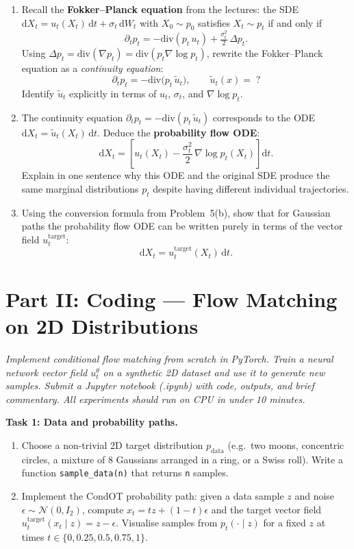 \documentclass[11pt]{article}
\theoremstyle{definition}
\theoremstyle{remark}
\newcommand{\N}{\mathcal{N}}
\newcommand{\dd}{\mathrm{d}}
\begin{document}
\begin{enumerate}\renewcommand{\labelenumi}{(\alph{enumi})}
\item Recall the \textbf{Fokker--Planck equation} from the lectures: the SDE $\dd X_t = u_t(X_t)\,\dd t + \sigma_t\,\dd W_t$ with $X_0 \sim p_0$ satisfies $X_t \sim p_t$ if and only if
\[
\partial_t p_t = -\mathrm{div}(p_t\, u_t) + \tfrac{\sigma_t^2}{2}\,\Delta p_t.
\]
Using $\Delta p_t = \mathrm{div}(\nabla p_t) = \mathrm{div}(p_t \nabla \log p_t)$, rewrite the Fokker--Planck equation as a \emph{continuity equation}:
\[
\partial_t p_t = -\mathrm{div}\!\bigl(p_t\,\tilde{u}_t\bigr), \qquad \tilde{u}_t(x) = \; ?
\]
Identify $\tilde{u}_t$ explicitly in terms of $u_t$, $\sigma_t$, and $\nabla \log p_t$.

\item The continuity equation $\partial_t p_t = -\mathrm{div}(p_t\,\tilde{u}_t)$ corresponds to the ODE $\dd X_t = \tilde{u}_t(X_t)\,\dd t$. Deduce the \textbf{probability flow ODE}:
\[
\boxed{\dd X_t = \left[u_t(X_t) - \frac{\sigma_t^2}{2}\,\nabla \log p_t(X_t)\right]\dd t.}
\]
Explain in one sentence why this ODE and the original SDE produce the same marginal distributions $p_t$ despite having different individual trajectories.

\item Using the conversion formula from Problem~5(b), show that for Gaussian paths the probability flow ODE can be written purely in terms of the vector field $u_t^{\mathrm{target}}$:
\[
\dd X_t = u_t^{\mathrm{target}}(X_t)\,\dd t.
\]

\end{enumerate}

\newpage

\section*{Part II: Coding --- Flow Matching on 2D Distributions}

\textit{Implement conditional flow matching from scratch in PyTorch. Train a neural network vector field $u_t^\theta$ on a synthetic 2D dataset and use it to generate new samples. Submit a Jupyter notebook (.ipynb) with code, outputs, and brief commentary. All experiments should run on CPU in under 10 minutes.}

\medskip

\textbf{Task 1: Data and probability paths.}
\begin{enumerate}\renewcommand{\labelenumi}{(\alph{enumi})}
\item Choose a non-trivial 2D target distribution $p_{\mathrm{data}}$ (e.g.\ two moons, concentric circles, a mixture of 8 Gaussians arranged in a ring, or a Swiss roll). Write a function \texttt{sample\_data(n)} that returns \texttt{n} samples.
\item Implement the CondOT probability path: given a data sample $z$ and noise $\epsilon \sim \N(0, I_2)$, compute $x_t = tz + (1-t)\epsilon$ and the target vector field $u_t^{\mathrm{target}}(x_t \mid z) = z - \epsilon$. Visualise samples from $p_t(\cdot \mid z)$ for a fixed $z$ at times $t \in \{0, 0.25, 0.5, 0.75, 1\}$.
\end{enumerate}
\end{document}
